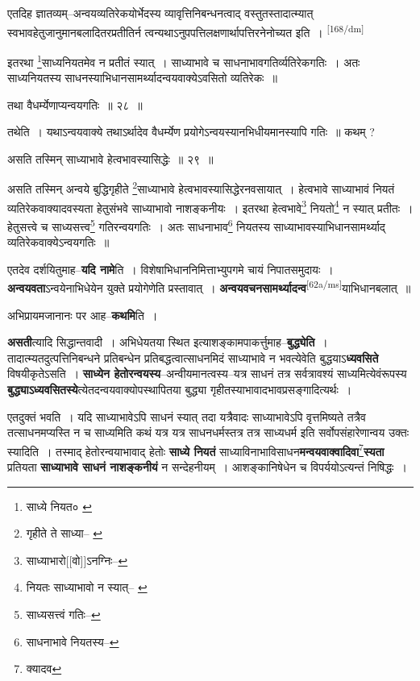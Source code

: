 \documentclass[article,12pt,a4paper]{memoir}
\begin{document}
	  \pstart एतदिह ज्ञातव्यम्--अन्वयव्यतिरेकयोर्भेदस्य व्यावृत्तिनिबन्धनत्वाद् वस्तुतस्तादात्म्यात् स्वभावहेतुजानुमानबलादितरप्रतीतिर्न त्वन्यथाऽनुपपत्तिलक्षणार्थापत्तिरनेनोच्यत इति ।
	\pend
      \leavevmode\textsuperscript{\rmlatinfont\tiny [168/dm]}

	  \pstart इतरथा \footnote{साध्ये नियत० \cite{dp-msC}}साध्यनियतमेव न प्रतीतं स्यात् । साध्याभावे च साधनाभावगतिर्व्यतिरेकगतिः । अतः साध्यनियतस्य साधनस्याभिधानसामर्थ्यादन्वयवाक्येऽवसितो व्यतिरेकः ॥
	\pend
       

	  \pstart तथा वैधर्म्येणाप्यन्वयगतिः ॥ २८ ॥
	\pend
       

	  \pstart तथेति । यथाऽन्वयवाक्ये तथाऽर्थादेव वैधर्म्येण प्रयोगेऽन्वयस्यानभिधीयमानस्यापि गतिः ॥ कथम् ?
	\pend
       

	  \pstart असति तस्मिन् साध्याभावे हेत्वभावस्यासिद्धेः ॥ २९ ॥
	\pend
       

	  \pstart असति तस्मिन् अन्वये बुद्धिगृहीते \footnote{गृहीते ते साध्या--\cite{dp-msA} \cite{dp-edP} \cite{dp-edH}}साध्याभावे हेत्वभावस्यासिद्धेरनवसायात् । हेत्वभावे साध्याभावं नियतं व्यतिरेकवाक्यादवस्यता हेतुसंभवे साध्याभावो नाशङ्कनीयः । इतरथा हेत्वभावे\footnote{साध्याभारो[[वो]]ऽनग्निः--\cite{dp-msD-n}} नियतो\footnote{नियतः साध्याभावो न स्यात्--\cite{dp-msA} \cite{dp-msB} \cite{dp-msD} \cite{dp-edP} \cite{dp-edH} \cite{dp-edE} \cite{dp-edN}} न स्यात् प्रतीतः । हेतुसत्त्वे च साध्यसत्त्व\footnote{साध्यसत्त्वं गतिः--\cite{dp-msA}} गतिरन्वयगतिः । अतः साधनाभाव\footnote{साधनाभावे नियतस्य--\cite{dp-msC}} नियतस्य साध्याभावस्याभिधानसामर्थ्याद् व्यतिरेकवाक्येऽन्वयगतिः ॥
	\pend
      

	  \pstart एतदेव दर्शयितुमाह--\textbf{यदि नामे}ति । विशेषाभिधाननिमित्ताभ्युपगमे चायं निपातसमुदायः । \textbf{अन्वयवता}ऽन्वयेनाभिधेयेन युक्ते प्रयोगेणेति प्रस्तावात् । \textbf{अन्वयवचनसामर्थ्यादन्व}\leavevmode\textsuperscript{\rmlatinfont\tiny [62a/ms]}याभिधानबलात् ॥
	\pend
      

	  \pstart अभिप्रायमजानानः पर आह--\textbf{कथमि}ति ।
	\pend
      

	  \pstart \textbf{असती}त्यादि सिद्धान्तवादी । अभिधेयतया स्थित इत्याशङ्कामपाकर्त्तुमाह--\textbf{बुद्ध्येति} । तादात्म्यतदुत्पत्तिनिबन्धने प्रतिबन्धेन प्रतिबद्धत्वात्साधनमिदं साध्याभावे न भवत्येवेति बुद्धयाऽ\textbf{ध्यवसिते} विषयीकृतेऽसति । \textbf{साध्येन हेतोरन्वयस्य}--अन्वीयमानत्वस्य--यत्र साधनं तत्र सर्वत्रावश्यं साध्यमित्येवंरूपस्य \textbf{बुद्ध्याऽध्यवसितस्ये}त्येतदन्वयवाक्योपस्थापितया बुद्ध्या गृहीतस्याभावादभावप्रसङ्गादित्यर्थः ।
	\pend
      

	  \pstart एतदुक्तं भवति । यदि साध्याभावेऽपि साधनं स्यात् तदा यत्रैवादः साध्याभावेऽपि वृत्तमिष्यते तत्रैव तत्साधनमप्यस्ति न च साध्यमिति कथं यत्र यत्र साधनधर्मस्तत्र तत्र साध्यधर्म इति सर्वोपसंहारेणान्वय उक्तः स्यादिति । तस्माद् हेतोरन्वयाभावाद् हेतोः \textbf{साध्ये नियतं} साध्याविनाभाविसाधन\textbf{मन्वयवाक्वादिवा}\footnote{क्यादव}\textbf{स्यता} प्रतियता \textbf{साध्याभावे साधनं नाशङ्कनीयं} न सन्देहनीयम् । आशङ्कानिषेधेन च विपर्ययोऽत्यन्तं निषिद्धः ।
	\pend
      
\end{document}

